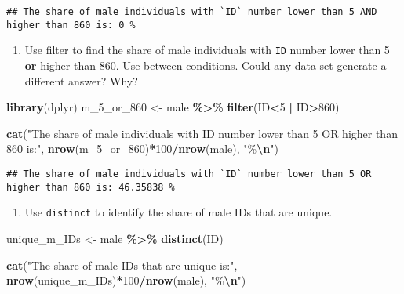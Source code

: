 \documentclass[
]{book}
\newenvironment{Shaded}{\begin{snugshade}}{\end{snugshade}}
\newcommand{\DecValTok}[1]{\textcolor[rgb]{0.00,0.00,0.81}{#1}}
\newcommand{\FunctionTok}[1]{\textcolor[rgb]{0.13,0.29,0.53}{\textbf{#1}}}
\newcommand{\NormalTok}[1]{#1}
\newcommand{\OtherTok}[1]{\textcolor[rgb]{0.56,0.35,0.01}{#1}}
\newcommand{\SpecialCharTok}[1]{\textcolor[rgb]{0.81,0.36,0.00}{\textbf{#1}}}
\newcommand{\StringTok}[1]{\textcolor[rgb]{0.31,0.60,0.02}{#1}}
\providecommand{\tightlist}{%
  \setlength{\itemsep}{0pt}\setlength{\parskip}{0pt}}
\begin{document}
\begin{verbatim}
## The share of male individuals with `ID` number lower than 5 AND higher than 860 is: 0 %
\end{verbatim}

\begin{enumerate}
\def\labelenumi{\arabic{enumi}.}
\setcounter{enumi}{8}
\tightlist
\item
  Use filter to find the share of male individuals with \texttt{ID} number lower than 5 \textbf{or} higher than 860. Use \texttt{\textbar{}} between conditions. Could any data set generate a different answer? Why?
\end{enumerate}

\begin{Shaded}
\begin{Highlighting}[]
\FunctionTok{library}\NormalTok{(dplyr)}
\NormalTok{m\_5\_or\_860 }\OtherTok{\textless{}{-}}\NormalTok{ male }\SpecialCharTok{\%\textgreater{}\%}
  \FunctionTok{filter}\NormalTok{(ID}\SpecialCharTok{\textless{}}\DecValTok{5} \SpecialCharTok{|}\NormalTok{ ID}\SpecialCharTok{\textgreater{}}\DecValTok{860}\NormalTok{)}

\FunctionTok{cat}\NormalTok{(}\StringTok{"The share of male individuals with \textasciigrave{}ID\textasciigrave{} number lower than 5 OR higher than 860 is:"}\NormalTok{, }\FunctionTok{nrow}\NormalTok{(m\_5\_or\_860)}\SpecialCharTok{*}\DecValTok{100}\SpecialCharTok{/}\FunctionTok{nrow}\NormalTok{(male), }\StringTok{"\%}\SpecialCharTok{\textbackslash{}n}\StringTok{"}\NormalTok{)}
\end{Highlighting}
\end{Shaded}

\begin{verbatim}
## The share of male individuals with `ID` number lower than 5 OR higher than 860 is: 46.35838 %
\end{verbatim}

\begin{enumerate}
\def\labelenumi{\arabic{enumi}.}
\setcounter{enumi}{9}
\tightlist
\item
  Use \texttt{distinct} to identify the share of male IDs that are unique.
\end{enumerate}

\begin{Shaded}
\begin{Highlighting}[]
\NormalTok{unique\_m\_IDs }\OtherTok{\textless{}{-}}\NormalTok{ male }\SpecialCharTok{\%\textgreater{}\%}
  \FunctionTok{distinct}\NormalTok{(ID)}
  
\FunctionTok{cat}\NormalTok{(}\StringTok{"The share of male IDs that are unique is:"}\NormalTok{, }\FunctionTok{nrow}\NormalTok{(unique\_m\_IDs)}\SpecialCharTok{*}\DecValTok{100}\SpecialCharTok{/}\FunctionTok{nrow}\NormalTok{(male), }\StringTok{"\%}\SpecialCharTok{\textbackslash{}n}\StringTok{"}\NormalTok{)}
\end{Highlighting}
\end{Shaded}
\end{document}

